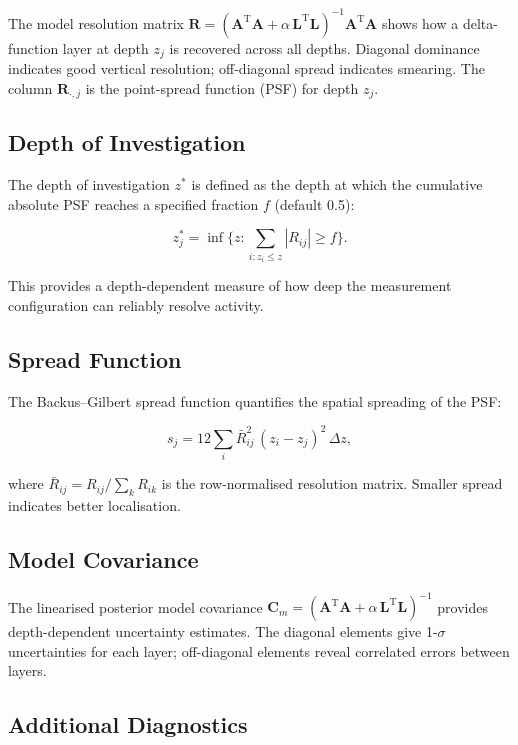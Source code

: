 \documentclass[a4paper,11pt]{article}
\begin{document}
The model resolution matrix $\bm{R} = (\bm{A}^\mathrm{T}\bm{A} + \alpha\,\bm{L}^\mathrm{T}\bm{L})^{-1}
\bm{A}^\mathrm{T}\bm{A}$ shows how a delta-function layer at depth $z_j$ is
recovered across all depths.  Diagonal dominance indicates good vertical
resolution; off-diagonal spread indicates smearing.  The column $\bm{R}_{\cdot,j}$
is the point-spread function (PSF) for depth $z_j$.

\subsection{Depth of Investigation}

The depth of investigation $z^*$ is defined as the depth at which the
cumulative absolute PSF reaches a specified fraction $f$ (default 0.5):

\begin{equation}
  z^*_j = \inf\{z : \sum_{i: z_i \leq z} |R_{ij}| \geq f\}.
\end{equation}

This provides a depth-dependent measure of how deep the measurement
configuration can reliably resolve activity.

\subsection{Spread Function}

The Backus--Gilbert spread function quantifies the spatial spreading
of the PSF:

\begin{equation}
  s_j = 12 \sum_i \bar{R}_{ij}^2\,(z_i - z_j)^2\,\Delta z,
\end{equation}

where $\bar{R}_{ij} = R_{ij}/\sum_k R_{ik}$ is the row-normalised resolution
matrix.  Smaller spread indicates better localisation.

\subsection{Model Covariance}

The linearised posterior model covariance
$\bm{C}_m = (\bm{A}^\mathrm{T}\bm{A} + \alpha\,\bm{L}^\mathrm{T}\bm{L})^{-1}$
provides depth-dependent uncertainty estimates.  The diagonal elements
give 1-$\sigma$ uncertainties for each layer; off-diagonal elements
reveal correlated errors between layers.

\subsection{Additional Diagnostics}
\end{document}
